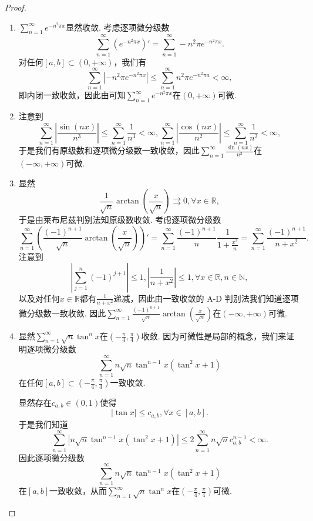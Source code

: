 \documentclass[../../main.tex]{subfiles}%
\begin{document}
\begin{proof}
\begin{enumerate}
\item \(\sum_{n=1}^{\infty} e^{-n^2 \pi x}\)显然收敛. 考虑逐项微分级数
\[
\sum_{n=1}^{\infty} \left( e^{-n^2 \pi x} \right)' = \sum_{n=1}^{\infty} -n^2 \pi e^{-n^2 \pi x}.
\]
对任何\([a, b] \subset (0, +\infty)\)，我们有
\[
\sum_{n=1}^{\infty} \left| -n^2 \pi e^{-n^2 \pi x} \right| \leqslant \sum_{n=1}^{\infty} n^2 \pi e^{-n^2 \pi a} < \infty,
\]
即内闭一致收敛，因此由可知\(\sum_{n=1}^{\infty} e^{-n^2 \pi x}\)在\((0, +\infty)\)可微.

\item  注意到
\[
\sum_{n=1}^{\infty} \left| \frac{\sin(nx)}{n^3} \right| \leqslant \sum_{n=1}^{\infty} \frac{1}{n^3} < \infty, \sum_{n=1}^{\infty} \left| \frac{\cos(nx)}{n^2} \right| \leqslant \sum_{n=1}^{\infty} \frac{1}{n^2} < \infty,
\]
于是我们有原级数和逐项微分级数一致收敛，因此\(\sum_{n=1}^{\infty} \frac{\sin(nx)}{n^3}\)在\((-\infty, +\infty)\)可微.

\item 显然
\[
\frac{1}{\sqrt{n}} \arctan \left( \frac{x}{\sqrt{n}} \right) \rightrightarrows 0, \forall x \in \mathbb{R},
\]
于是由莱布尼兹判别法知原级数收敛. 考虑逐项微分级数
\[
\sum_{n=1}^{\infty} \left( \frac{(-1)^{n+1}}{\sqrt{n}} \arctan \left( \frac{x}{\sqrt{n}} \right) \right)' = \sum_{n=1}^{\infty} \frac{(-1)^{n+1}}{n} \frac{1}{1 + \frac{x^2}{n}} = \sum_{n=1}^{\infty} \frac{(-1)^{n+1}}{n + x^2}.
\]
注意到
\[
\left| \sum_{j=1}^{n} (-1)^{j+1} \right| \leqslant 1, \left| \frac{1}{n + x^2} \right| \leqslant 1, \forall x \in \mathbb{R}, n \in \mathbb{N},
\]
以及对任何\(x \in \mathbb{R}\)都有\(\frac{1}{n + x^2}\)递减，因此由一致收敛的 A-D 判别法我们知道逐项微分级数一致收敛. 因此\(\sum_{n=1}^{\infty} \frac{(-1)^{n+1}}{\sqrt{n}} \arctan \left( \frac{x}{\sqrt{n}} \right)\)在\((-\infty, +\infty)\)可微.

\item 显然\(\sum_{n=1}^{\infty} \sqrt{n} \tan^n x\)在\(\left( -\frac{\pi}{4}, \frac{\pi}{4} \right)\)收敛. 因为可微性是局部的概念，我们来证明逐项微分级数
\[
\sum_{n=1}^{\infty} n \sqrt{n} \tan^{n - 1} x \left( \tan^2 x + 1 \right)
\]
在任何\([a, b] \subset \left( -\frac{\pi}{4}, \frac{\pi}{4} \right)\)一致收敛.

显然存在\(c_{a,b} \in (0, 1)\)使得
\[
|\tan x| \leqslant c_{a,b}, \forall x \in [a, b].
\]
于是我们知道
\[
\sum_{n=1}^{\infty} \left| n \sqrt{n} \tan^{n - 1} x \left( \tan^2 x + 1 \right) \right| \leqslant 2 \sum_{n=1}^{\infty} n \sqrt{n} c_{a,b}^{n - 1} < \infty.
\]
因此逐项微分级数
\[
\sum_{n=1}^{\infty} n \sqrt{n} \tan^{n - 1} x \left( \tan^2 x + 1 \right)
\]
在\([a, b]\)一致收敛，从而\(\sum_{n=1}^{\infty} \sqrt{n} \tan^n x\)在\(\left( -\frac{\pi}{4}, \frac{\pi}{4} \right)\)可微.
\end{enumerate}
\end{proof}
\end{document}
